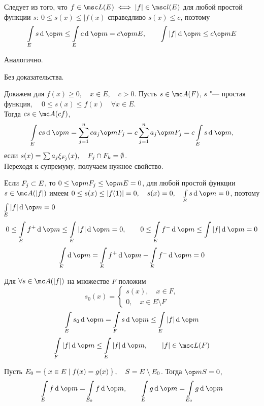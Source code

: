 \begin{eproof}
	\item Следует из того, что $ f \in \msc L(E) \iff |f| \in \msc l(E) $ для любой простой функции $ s : ~ 0 \le s(x) \le |f(x) $ справедливо $ s(x) \le c $, поэтому
	$$ \int\limits_E s \di \op m \le \int\limits_E c \di \op m = c \op m E, \qquad \int |f| \di \op m \le c \op m E $$

	\item Аналогично.

	\item Без доказательства.

	\item Докажем для $ f(x) \ge 0, \quad x \in E, \quad c > 0 $. Пусть $ s \in \mc A(F) $, \ie $ s $ "--- простая функция, $ \quad 0 \le s(x) \le f(x) \quad \forall x \in E $. \\
	Тогда $ cs \in \mc A(cf) $,
	$$ \int\limits_{E} cs \di \op m = \sum_{j = 1}^n ca_j \op m F_j = c \sum_{j = 1}^n a_j \op m F_j = c \int\limits_E s \di \op m, $$
	если $ s(x) = \sum a_j \xi_{F_j}(x), \quad F_j \cap F_k = \emptyset $. \\
	Переходя к супремуму, получаем нужное свойство.

	\item Если $ F_j \subset E $, то $ 0 \le \op m F_j \le \op m E = 0 $, для любой простой функции $ s \in \mc A(|f|) $ имеем $ 0 \le s(x) \le |f(1)| = 0, \quad s(x) = 0, \quad \int\limits_E s \di \op m = 0 $, поэтому $ \int\limits_E |f| \di \op m = 0 $
	$$ 0 \le \int\limits_E f^+ \di \op m \le \int\limits_E |f| \di \op m = 0, \qquad 0 \le \int\limits_E f^- \di \op m \le \int |f| \di \op m = 0 $$
	$$ \int\limits_E \di \op m = \int\limits_E f^+ \di \op m - \int\limits_E f^- \di \op m = 0 $$

	\item Для $ \forall s \in \mc A(|f|) $ на множестве $ F $ положим
	$$ s_0(x) =
	\begin{cases}
		s(x), \quad x \in F, \\
		0, \quad x \in E \setminus F
	\end{cases} $$
	$$ \int\limits_E s_0 \di \op m = \int\limits_F s \di \op m \le \int\limits_E |f| \di \op m $$
	$$ \int \limits_F |f| \di \op m \le \int\limits_E |f| \di \op m, \qquad |f| \in \msc L(F) $$

	\item Пусть $ E_0 = \Set{x \in E \mid f(x) = g(x)}, \quad S = E \setminus E_0 $. Тогда $ \op m S = 0 $,
	$$ \int\limits_E f \di \op m = \int\limits_{E_0} f \di \op m, \qquad \int\limits_E g \di \op m = \int\limits_{E_0} g \di \op m $$
\end{eproof}

